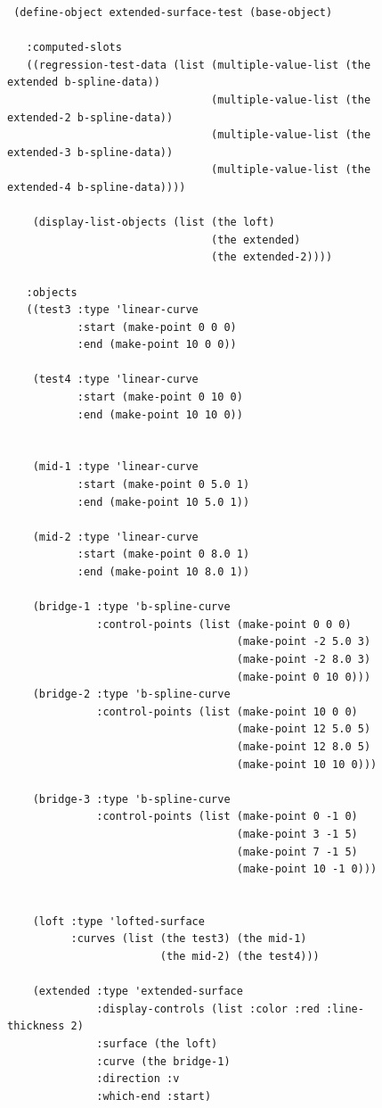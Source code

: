 \documentclass [11pt]{book}
\begin{document}
\begin{itemize}
\begin{figure}
\begin{lrbox}{\boxedverb}
\begin{minipage}{\linewidth}
{\begin{verbatim}
 (define-object extended-surface-test (base-object)
  
   :computed-slots
   ((regression-test-data (list (multiple-value-list (the extended b-spline-data))
                                (multiple-value-list (the extended-2 b-spline-data))
                                (multiple-value-list (the extended-3 b-spline-data))
                                (multiple-value-list (the extended-4 b-spline-data))))
   
    (display-list-objects (list (the loft)
                                (the extended)
                                (the extended-2))))
  
   :objects
   ((test3 :type 'linear-curve 
           :start (make-point 0 0 0) 
           :end (make-point 10 0 0))
   
    (test4 :type 'linear-curve
           :start (make-point 0 10 0) 
           :end (make-point 10 10 0))
   
   
    (mid-1 :type 'linear-curve
           :start (make-point 0 5.0 1)
           :end (make-point 10 5.0 1))
   
    (mid-2 :type 'linear-curve
           :start (make-point 0 8.0 1)
           :end (make-point 10 8.0 1))
   
    (bridge-1 :type 'b-spline-curve
              :control-points (list (make-point 0 0 0)
                                    (make-point -2 5.0 3) 
                                    (make-point -2 8.0 3) 
                                    (make-point 0 10 0)))       
    (bridge-2 :type 'b-spline-curve
              :control-points (list (make-point 10 0 0)
                                    (make-point 12 5.0 5) 
                                    (make-point 12 8.0 5) 
                                    (make-point 10 10 0)))      

    (bridge-3 :type 'b-spline-curve
              :control-points (list (make-point 0 -1 0)
                                    (make-point 3 -1 5)
                                    (make-point 7 -1 5)
                                    (make-point 10 -1 0)))

   
    (loft :type 'lofted-surface
          :curves (list (the test3) (the mid-1) 
                        (the mid-2) (the test4)))
   
    (extended :type 'extended-surface
              :display-controls (list :color :red :line-thickness 2)
              :surface (the loft)
              :curve (the bridge-1)
              :direction :v
              :which-end :start)


\end{verbatim}}
\end{minipage}
\end{lrbox}
\end{figure}
\end{itemize}
\end{document}
